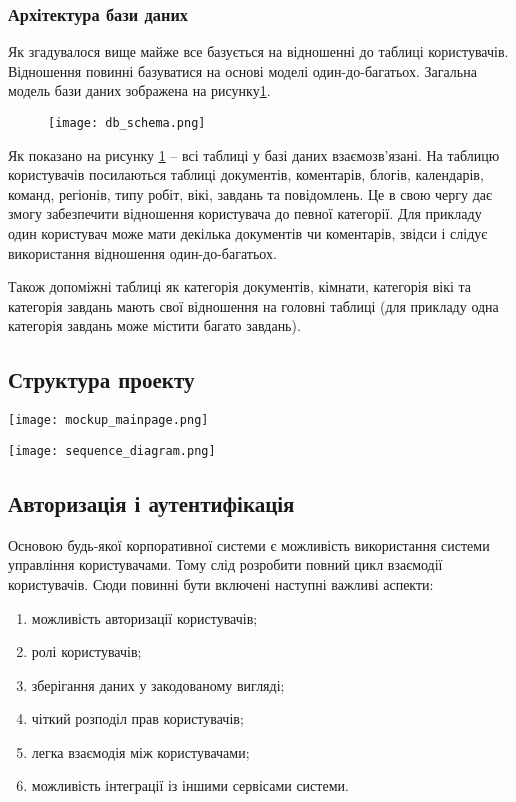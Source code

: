 \subsubsection{Архітектура бази даних}
Як згадувалося вище майже все базується на відношенні до таблиці користувачів. Відношення повинні базуватися на основі моделі один-до-багатьох. Загальна модель бази даних зображена на рисунку\ref{pic:db_shema}.
\begin{figure}[!ht]
\centering
		\texttt{[image: db\_schema.png]}
		\label{pic:db_shema}
\end{figure}
\par Як показано на рисунку \ref{pic:db_shema} -- всі таблиці у базі даних взаємозв'язані. На таблицю користувачів посилаються таблиці документів, коментарів, блогів, календарів, команд, регіонів, типу робіт, вікі, завдань та повідомлень. 
Це в свою чергу дає змогу забезпечити відношення користувача до певної категорії. 
Для прикладу один користувач може мати декілька документів чи коментарів, звідси і слідує використання відношення один-до-багатьох. 
\par Також допоміжні таблиці як категорія документів, кімнати, категорія вікі та категорія завдань мають свої відношення на головні таблиці (для прикладу одна категорія завдань може містити багато завдань).

\subsection{Структура проекту}

\begin{center}
		\texttt{[image: mockup\_mainpage.png]}
\end{center}


\begin{center}
		\texttt{[image: sequence\_diagram.png]}
\end{center}


\subsection{Авторизація і аутентифікація}
Основою будь-якої корпоративної системи є можливість використання системи управління користувачами.
Тому слід розробити повний цикл взаємодії користувачів. Сюди повинні бути включені наступні важливі аспекти:
\begin{enumerate}
	\item можливість авторизації користувачів;
	\item ролі користувачів;
	\item зберігання даних у закодованому вигляді;
	\item чіткий розподіл прав користувачів;
	\item легка взаємодія між користувачами;
	\item можливість інтеграції із іншими сервісами системи.
\end{enumerate}

